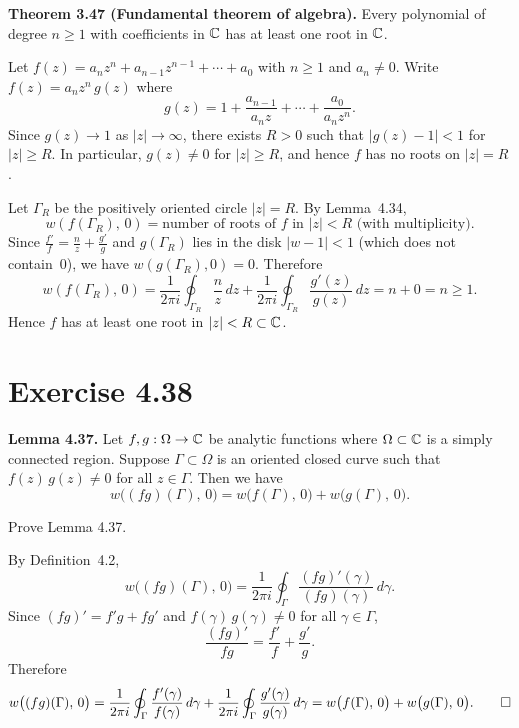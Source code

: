 \documentclass{article}
\begin{document}
\begin{solution}
  \textbf{Theorem 3.47 (Fundamental theorem of algebra).}
  Every polynomial of degree $n \ge 1$ with coefficients in $\mathbb{C}$
  has at least one root in $\mathbb{C}$.

  \medskip

  Let $f(z) = a_n z^n + a_{n-1}z^{n-1} + \cdots + a_0$
  with $n \ge 1$ and $a_n \ne 0$.
  Write $f(z) = a_n z^n\,g(z)$ where
  \[
    g(z) = 1 + \frac{a_{n-1}}{a_n z} + \cdots + \frac{a_0}{a_n z^n}.
  \]
  Since $g(z) \to 1$ as $|z| \to \infty$, there exists $R > 0$
  such that $|g(z) - 1| < 1$ for $|z| \ge R$.
  In particular, $g(z) \ne 0$ for $|z| \ge R$, and hence $f$
  has no roots on $|z| = R$.

  Let $\Gamma_R$ be the positively oriented circle $|z| = R$.
  By Lemma~4.34,
  \[
    w(f(\Gamma_R),\, 0)
    = \text{number of roots of } f \text{ in } |z| < R
      \text{ (with multiplicity)}.
  \]
  Since $\frac{f'}{f} = \frac{n}{z} + \frac{g'}{g}$ and
  $g(\Gamma_R)$ lies in the disk $|w - 1| < 1$ (which does not
  contain~$0$), we have $w(g(\Gamma_R), 0) = 0$.
  Therefore
  \[
    w(f(\Gamma_R),\, 0)
    = \frac{1}{2\pi i}\oint_{\Gamma_R}\!\frac{n}{z}\,dz
    + \frac{1}{2\pi i}\oint_{\Gamma_R}\!\frac{g'(z)}{g(z)}\,dz
    = n + 0 = n \ge 1.
  \]
  Hence $f$ has at least one root in $|z| < R \subset \mathbb{C}$.\qedhere
\end{solution}

\section{Exercise 4.38}

\textbf{Lemma 4.37.}
Let $f, g : \Omega \to \mathbb{C}$ be analytic functions where
$\Omega \subset \mathbb{C}$ is a simply connected region.  Suppose
$\Gamma \subset \Omega$ is an oriented closed curve such that
$f(z)\,g(z) \ne 0$ for all $z \in \Gamma$.  Then we have
\[
  w\bigl((fg)(\Gamma),\, 0\bigr)
  = w\bigl(f(\Gamma),\, 0\bigr)
  + w\bigl(g(\Gamma),\, 0\bigr).
\]

Prove Lemma 4.37.

\begin{solution}
  By Definition~4.2,
  \[
    w\bigl((fg)(\Gamma),\, 0\bigr)
    = \frac{1}{2\pi i}\oint_\Gamma
      \frac{(fg)'(\gamma)}{(fg)(\gamma)}\,d\gamma.
  \]
  Since $(fg)' = f'g + fg'$ and
  $f(\gamma)\,g(\gamma) \ne 0$ for all $\gamma \in \Gamma$,
  \[
    \frac{(fg)'}{fg} = \frac{f'}{f} + \frac{g'}{g}.
  \]
  Therefore
  \[
    w\bigl((fg)(\Gamma),\, 0\bigr)
    = \frac{1}{2\pi i}\oint_\Gamma \frac{f'(\gamma)}{f(\gamma)}\,d\gamma
    + \frac{1}{2\pi i}\oint_\Gamma \frac{g'(\gamma)}{g(\gamma)}\,d\gamma
    = w\bigl(f(\Gamma),\, 0\bigr) + w\bigl(g(\Gamma),\, 0\bigr).\qedhere
  \]
\end{solution}
\end{document}
